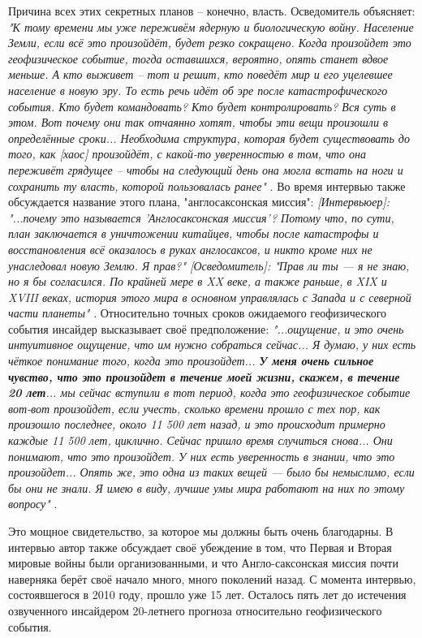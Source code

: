 \documentclass[10pt,twocolumn,letterpaper]{article}
\begin{document}
Причина всех этих секретных планов – конечно, власть. Осведомитель объясняет: \textit{"К тому времени мы уже переживём ядерную и биологическую войну. Население Земли, если всё это произойдёт, будет резко сокращено. Когда произойдет это геофизическое событие, тогда оставшихся, вероятно, опять станет вдвое меньше. А кто выживет – тот и решит, кто поведёт мир и его уцелевшее население в новую эру. То есть речь идёт об эре после катастрофического события. Кто будет командовать? Кто будет контролировать? Вся суть в этом. Вот почему они так отчаянно хотят, чтобы эти вещи произошли в определённые сроки... Необходима структура, которая будет существовать до того, как [хаос] произойдёт, с какой-то уверенностью в том, что она переживёт грядущее – чтобы на следующий день она могла встать на ноги и сохранить ту власть, которой пользовалась ранее"} \cite{4}. Во время интервью также обсуждается название этого плана, "англосаксонская миссия": \textit{[Интервьюер]: "...почему это называется 'Англосаксонская миссия'? Потому что, по сути, план заключается в уничтожении китайцев, чтобы после катастрофы и восстановления всё оказалось в руках англосаксов, и никто кроме них не унаследовал новую Землю. Я прав?" [Осведомитель]: "Прав ли ты — я не знаю, но я бы согласился. По крайней мере в XX веке, а также раньше, в XIX и XVIII веках, история этого мира в основном управлялась с Запада и с северной части планеты"} \cite{4}.
Относительно точных сроков ожидаемого геофизического события инсайдер высказывает своё предположение: \textit{"...ощущение, и это очень интуитивное ощущение, что им нужно собраться сейчас... Я думаю, у них есть чёткое понимание того, когда это произойдет... \textbf{У меня очень сильное чувство, что это произойдет в течение моей жизни, скажем, в течение 20 лет}... мы сейчас вступили в тот период, когда это геофизическое событие вот-вот произойдет, если учесть, сколько времени прошло с тех пор, как произошло последнее, около 11 500 лет назад, и это происходит примерно каждые 11 500 лет, циклично. Сейчас пришло время случиться снова... Они понимают, что это произойдет. У них есть уверенность в знании, что это произойдет... Опять же, это одна из таких вещей — было бы немыслимо, если бы они не знали. Я имею в виду, лучшие умы мира работают на них по этому вопросу"} \cite{4}.

Это мощное свидетельство, за которое мы должны быть очень благодарны. В интервью автор также обсуждает своё убеждение в том, что Первая и Вторая мировые войны были организованными, и что Англо-саксонская миссия почти наверняка берёт своё начало много, много поколений назад. С момента интервью, состоявшегося в 2010 году, прошло уже 15 лет. Осталось пять лет до истечения озвученного инсайдером 20-летнего прогноза относительно геофизического события.
\end{document}
